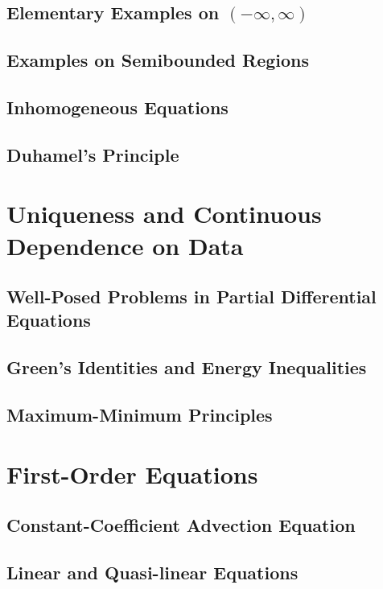 \documentclass{amsbook}%
\theoremstyle{plain}
\numberwithin{equation}{section}
\begin{document}
	\section{Elementary Examples on $(-\infty,\infty)$}
	
	\section{Examples on Semibounded Regions}
	
	\section{Inhomogeneous Equations}
	
	\section{Duhamel's Principle}

\chapter{Uniqueness and Continuous Dependence on Data}

	\section{Well-Posed Problems in Partial Differential Equations}
	
	\section{Green's Identities and Energy Inequalities}
	
	\section{Maximum-Minimum Principles}

\chapter{First-Order Equations}

	\section{Constant-Coefficient Advection Equation}
	
	\section{Linear and Quasi-linear Equations}
	
\end{document}
